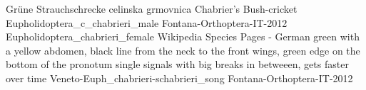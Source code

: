 {Grüne Strauchschrecke} %
{celinska grmovnica} %
{Chabrier's Bush-cricket} %
{Eupholidoptera_c_chabrieri_male}  %
{Fontana-Orthoptera-IT-2012} %
{Eupholidoptera_chabrieri_female} %
{Wikipedia Species Pages - German} %
{green with a yellow abdomen, black line from the neck to the front wings, green edge on the bottom of the pronotum} %
{single signals with big breaks in betweeen, gets faster over time} %
{Veneto-Euph_chabrieri-schabrieri_song} %
{Fontana-Orthoptera-IT-2012} %
